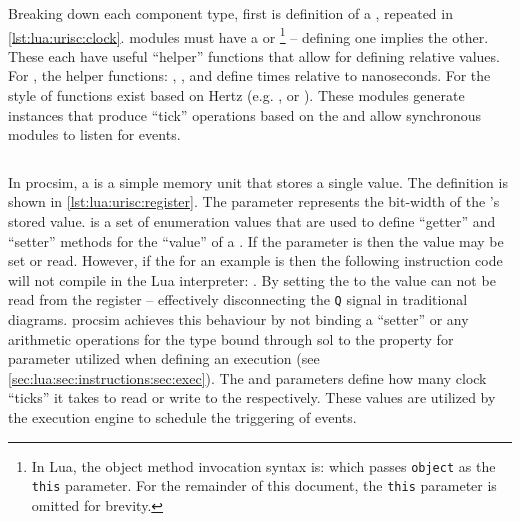 Breaking down each component type, first is definition of a , repeated in \cref{lst:lua:urisc:clock}.  modules must have a  or \footnote{In Lua, the object method invocation syntax is:  which passes \texttt{object} as the \texttt{this} parameter. For the remainder of this document, the \texttt{this} parameter is omitted for brevity.} -- defining one implies the other. These each have useful ``helper'' functions that allow for defining relative values. For , the helper functions: , ,  and  define times relative to nanoseconds. For  the style of functions exist based on Hertz (e.g. , or ). These  modules generate instances that produce ``tick'' operations based on the  and allow synchronous modules to listen for events. 

\begin{listing}[h!]
    \inputminted[escapeinside=||, firstline=10, lastline=13]{lua}{./listings/urisc.lua}
    \caption{ configuration for the processors main clock (cut from \cref{lst:lua:urisc-example-1}).}
    \label{lst:lua:urisc:clock}
\end{listing}

In procsim, a  is a simple memory unit that stores a single value. The  definition is shown in \cref{lst:lua:urisc:register}. The  parameter represents the bit-width of the 's stored value.  is a set of enumeration values that are used to define ``getter'' and ``setter'' methods for the ``value'' of a . If the  parameter is  then the value may be set or read. However, if the  for an example   is  then the following instruction code will not compile in the Lua interpreter: . By setting the  to  the value can not be read from the register -- effectively disconnecting the \verb|Q| signal in traditional  diagrams. procsim achieves this behaviour by not binding a ``setter'' or any arithmetic operations for the  type bound through sol to the property for  parameter utilized when defining an  execution (see \cref{sec:lua:sec:instructions:sec:exec}). The  and  parameters define how many clock ``ticks'' it takes to read or write to the  respectively. These values are utilized by the execution engine to schedule the triggering of events.

